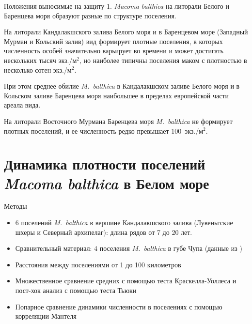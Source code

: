 \documentclass{beamer}
\begin{document}
\begin{frame}{Положения выносимые на защиту}
 1. \textit{Macoma balthica} на литорали Белого и Баренцева моря образуют разные по структуре поселения.

\smallskip
На литорали Кандалакшского залива Белого моря и в Баренцевом море (Западный Мурман и Кольский залив) вид  формирует плотные поселения, в которых численность особей значительно варьирует во времени и может достигать нескольких тысяч экз./м$^2$, но наиболее типичны поселения маком с плотностью в несколько сотен экз./м$^2$. 

\smallskip
При этом среднее обилие \textit{M.~balthica} в Кандалакшском заливе Белого моря и в Кольском заливе Баренцева моря наибольшее в пределах европейской части ареала вида.

\smallskip
На литорали Восточного Мурмана Баренцева моря \textit{M.~balthica} не формирует плотных поселений, и ее численность редко превышает 100~экз./м$^2$.
\end{frame}
		\section[Динамика обилия]{Динамика плотности поселений {\it Macoma balthica} в Белом море}
\begin{frame}{Методы}
	\begin{itemize}
		\item 6 поселений {\it M.~balthica} в вершине Кандалакшского залива (Лувеньгские шхеры и Северный архипелаг): длина рядов от 7 до 20 лет.
		\item Сравнительный материал: 4 поселения {\it M.~balthica} в губе Чупа (данные из \cite{Maximovich_et_al_1991, Gerasimova_Maximovich_2013, Varfolomeeva_Naumov_2013})
		\item Расстояния между поселениями от 1 до 100 километров
		\item Множественное сравнение средних с помощью теста Краскелла-Уоллеса и пост-хок анализ с помощью теста Тьюки
		\item Попарное сравнение динамики численности в поселениях с помощью корреляции Мантеля
	\end{itemize}
\end{frame}
\end{document}
